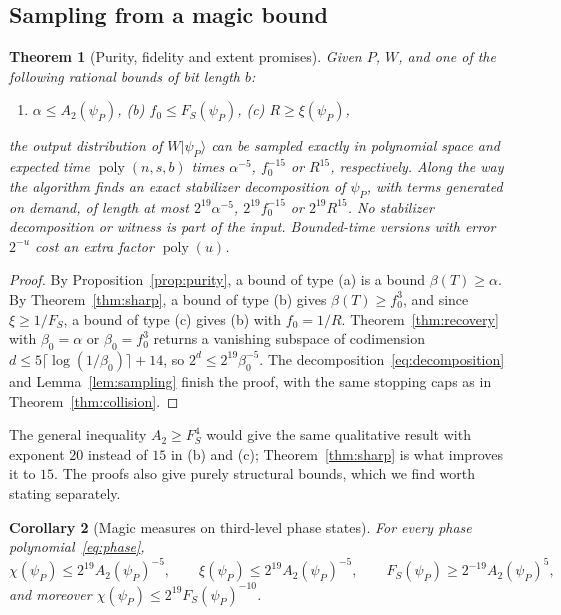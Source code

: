 \documentclass[a4paper,onecolumn,11pt,unpublished]{quantumarticle}
\theoremstyle{plain}
\newtheorem{theorem}{Theorem}
\newtheorem{corollary}[theorem]{Corollary}
\theoremstyle{remark}
\newcommand{\ket}[1]{|#1\rangle}
\DeclareMathOperator{\poly}{poly}
\begin{document}
\subsection{Sampling from a magic bound}

\begin{theorem}[Purity, fidelity and extent promises]\label{thm:extent}
Given $P$, $W$, and one of the following rational bounds of bit length $b$:
\begin{enumerate}
\item[(a)] $\alpha\le A_2(\psi_P)$, \quad (b) $f_0\le F_S(\psi_P)$, \quad (c) $R\ge\xi(\psi_P)$,
\end{enumerate}
the output distribution of $W\ket{\psi_P}$ can be sampled exactly in polynomial space and expected time $\poly(n,s,b)$ times $\alpha^{-5}$, $f_0^{-15}$ or $R^{15}$, respectively. Along the way the algorithm finds an exact stabilizer decomposition of $\psi_P$, with terms generated on demand, of length at most $2^{19}\alpha^{-5}$, $2^{19}f_0^{-15}$ or $2^{19}R^{15}$. No stabilizer decomposition or witness is part of the input. Bounded-time versions with error $2^{-u}$ cost an extra factor $\poly(u)$.
\end{theorem}

\begin{proof}
By Proposition~\ref{prop:purity}, a bound of type (a) is a bound $\beta(T)\ge\alpha$. By Theorem~\ref{thm:sharp}, a bound of type (b) gives $\beta(T)\ge f_0^3$, and since $\xi\ge1/F_S$, a bound of type (c) gives (b) with $f_0=1/R$. Theorem~\ref{thm:recovery} with $\beta_0=\alpha$ or $\beta_0=f_0^3$ returns a vanishing subspace of codimension $d\le5\lceil\log(1/\beta_0)\rceil+14$, so $2^d\le2^{19}\beta_0^{-5}$. The decomposition~\eqref{eq:decomposition} and Lemma~\ref{lem:sampling} finish the proof, with the same stopping caps as in Theorem~\ref{thm:collision}.
\end{proof}

The general inequality $A_2\ge F_S^4$ would give the same qualitative result with exponent $20$ instead of $15$ in (b) and (c); Theorem~\ref{thm:sharp} is what improves it to $15$. The proofs also give purely structural bounds, which we find worth stating separately.

\begin{corollary}[Magic measures on third-level phase states]\label{cor:measures}
For every phase polynomial~\eqref{eq:phase},
\[
\chi(\psi_P)\le2^{19}A_2(\psi_P)^{-5},\qquad \xi(\psi_P)\le2^{19}A_2(\psi_P)^{-5},\qquad F_S(\psi_P)\ge2^{-19}A_2(\psi_P)^{5},
\]
and moreover $\chi(\psi_P)\le2^{19}F_S(\psi_P)^{-10}$.
\end{corollary}
\end{document}
